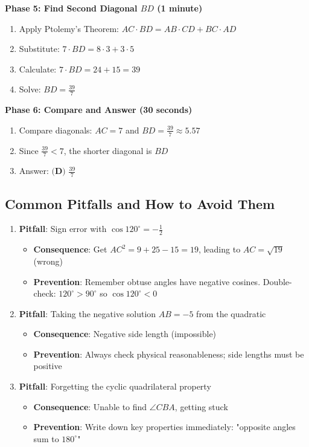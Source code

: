 \documentclass[11pt]{article}
\begin{document}
\begin{solutionbox}
\textbf{Phase 5: Find Second Diagonal $BD$ (1 minute)}
\begin{enumerate}[resume]
    \item Apply Ptolemy's Theorem: $AC \cdot BD = AB \cdot CD + BC \cdot AD$
    \item Substitute: $7 \cdot BD = 8 \cdot 3 + 3 \cdot 5$
    \item Calculate: $7 \cdot BD = 24 + 15 = 39$
    \item Solve: $BD = \frac{39}{7}$
\end{enumerate}

\textbf{Phase 6: Compare and Answer (30 seconds)}
\begin{enumerate}[resume]
    \item Compare diagonals: $AC = 7$ and $BD = \frac{39}{7} \approx 5.57$
    \item Since $\frac{39}{7} < 7$, the shorter diagonal is $BD$
    \item Answer: $\boxed{\textbf{(D) } \frac{39}{7}}$
\end{enumerate}

\subsection*{Common Pitfalls and How to Avoid Them}

\begin{enumerate}
    \item \textbf{Pitfall}: Sign error with $\cos 120^\circ = -\frac{1}{2}$
    \begin{itemize}
        \item \textbf{Consequence}: Get $AC^2 = 9 + 25 - 15 = 19$, leading to $AC = \sqrt{19}$ (wrong)
        \item \textbf{Prevention}: Remember obtuse angles have negative cosines. Double-check: $120^\circ > 90^\circ$ so $\cos 120^\circ < 0$
    \end{itemize}
    
    \item \textbf{Pitfall}: Taking the negative solution $AB = -5$ from the quadratic
    \begin{itemize}
        \item \textbf{Consequence}: Negative side length (impossible)
        \item \textbf{Prevention}: Always check physical reasonableness; side lengths must be positive
    \end{itemize}
    
    \item \textbf{Pitfall}: Forgetting the cyclic quadrilateral property
    \begin{itemize}
        \item \textbf{Consequence}: Unable to find $\angle CBA$, getting stuck
        \item \textbf{Prevention}: Write down key properties immediately: "opposite angles sum to $180^\circ$"
    \end{itemize}
    

\end{enumerate}
\end{solutionbox}
\end{document}

